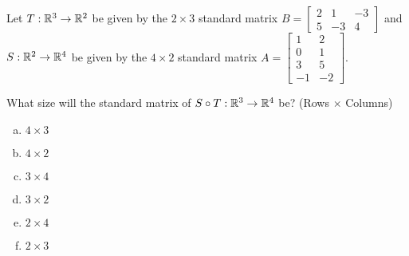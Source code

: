 \begin{activity}{2}
Let $T: \mathbb{R}^3 \rightarrow \mathbb{R}^2$ be given by the \(2\times 3\) standard matrix $B=\begin{bmatrix} 2 & 1 & -3 \\ 5 & -3 & 4 \end{bmatrix}$ and $S: \mathbb{R}^2 \rightarrow \mathbb{R}^4$ be given by the \(4\times 2\) standard matrix $A=\begin{bmatrix} 1 & 2 \\ 0 & 1 \\ 3 & 5 \\ -1 & -2 \end{bmatrix}$.

What size will the standard matrix of $S \circ T:\mathbb{R}^3\to\mathbb{R}^4$ be?
(Rows \(\times\) Columns)
\begin{multicols}{3}
\begin{enumerate}[(a)]
\item $4 \times 3$
\item $4 \times 2$
\item $3 \times 4$
\item $3 \times 2$
\item $2 \times 4$
\item $2 \times 3$
\end{enumerate}
\end{multicols}
\end{activity}

